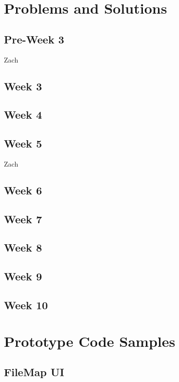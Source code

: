 \documentclass[letterpaper,10pt,titlepage,draftclsnofoot,onecolumn,onesided] {IEEEtran}
\begin{document}
\section{Problems and Solutions}
	\subsection{Pre-Week 3}
	Zach
	\subsection{Week 3}

	\subsection{Week 4}

	\subsection{Week 5}
	Zach
	\subsection{Week 6}

	\subsection{Week 7}

	\subsection{Week 8}

	\subsection{Week 9}

	\subsection{Week 10}

\section{Prototype Code Samples}
	
	\subsection{FileMap UI}
	\begin{lstlisting}

	\end{lstlisting}
\end{document}

